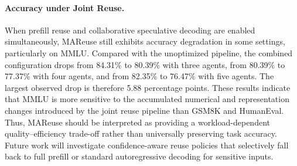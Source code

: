 \documentclass[letterpaper]{article} %
\begin{document}
\paragraph{Accuracy under Joint Reuse.}
When prefill reuse and collaborative speculative decoding are enabled simultaneously, MAReuse still exhibits accuracy degradation in some settings, particularly on MMLU. Compared with the unoptimized pipeline, the combined configuration drops from 84.31\% to 80.39\% with three agents, from 80.39\% to 77.37\% with four agents, and from 82.35\% to 76.47\% with five agents. The largest observed drop is therefore 5.88 percentage points. These results indicate that MMLU is more sensitive to the accumulated numerical and representation changes introduced by the joint reuse pipeline than GSM8K and HumanEval. Thus, MAReuse should be interpreted as providing a workload-dependent quality--efficiency trade-off rather than universally preserving task accuracy. Future work will investigate confidence-aware reuse policies that selectively fall back to full prefill or standard autoregressive decoding for sensitive inputs.


\end{document}

